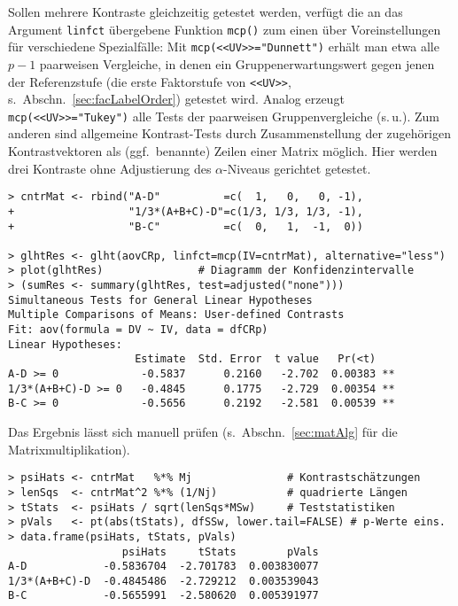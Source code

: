 Sollen mehrere Kontraste gleichzeitig getestet werden, verfügt die an das Argument \lstinline!linfct! übergebene Funktion \lstinline!mcp()! zum einen über Voreinstellungen für verschiedene Spezialfälle: Mit \lstinline!mcp(<<UV>>="Dunnett")! erhält man etwa alle $p-1$ paarweisen Vergleiche, in denen ein Gruppenerwartungswert gegen jenen der Referenzstufe (die erste Faktorstufe von \lstinline!<<UV>>!, s.\ Abschn.\ \ref{sec:facLabelOrder}) getestet wird. Analog erzeugt \lstinline!mcp(<<UV>>="Tukey")! alle Tests der paarweisen Gruppenvergleiche (s.\,u.). Zum anderen sind allgemeine Kontrast-Tests durch Zusammenstellung der zugehörigen Kontrastvektoren als (ggf.\ benannte) Zeilen einer Matrix möglich. Hier werden drei Kontraste ohne Adjustierung des $\alpha$-Niveaus gerichtet getestet.
\begin{lstlisting}
> cntrMat <- rbind("A-D"          =c(  1,   0,   0, -1),
+                  "1/3*(A+B+C)-D"=c(1/3, 1/3, 1/3, -1),
+                  "B-C"          =c(  0,   1,  -1,  0))

> glhtRes <- glht(aovCRp, linfct=mcp(IV=cntrMat), alternative="less")
> plot(glhtRes)               # Diagramm der Konfidenzintervalle
> (sumRes <- summary(glhtRes, test=adjusted("none")))
Simultaneous Tests for General Linear Hypotheses
Multiple Comparisons of Means: User-defined Contrasts
Fit: aov(formula = DV ~ IV, data = dfCRp)
Linear Hypotheses:
                    Estimate  Std. Error  t value   Pr(<t)
A-D >= 0             -0.5837      0.2160   -2.702  0.00383 **
1/3*(A+B+C)-D >= 0   -0.4845      0.1775   -2.729  0.00354 **
B-C >= 0             -0.5656      0.2192   -2.581  0.00539 **
\end{lstlisting}

Das Ergebnis lässt sich manuell prüfen (s.\ Abschn.\ \ref{sec:matAlg} für die Matrixmultiplikation).
\begin{lstlisting}
> psiHats <- cntrMat   %*% Mj               # Kontrastschätzungen
> lenSqs  <- cntrMat^2 %*% (1/Nj)           # quadrierte Längen
> tStats  <- psiHats / sqrt(lenSqs*MSw)     # Teststatistiken
> pVals   <- pt(abs(tStats), dfSSw, lower.tail=FALSE) # p-Werte eins.
> data.frame(psiHats, tStats, pVals)
                  psiHats     tStats        pVals
A-D            -0.5836704  -2.701783  0.003830077
1/3*(A+B+C)-D  -0.4845486  -2.729212  0.003539043
B-C            -0.5655991  -2.580620  0.005391977
\end{lstlisting}


